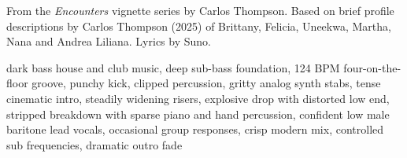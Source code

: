 
\begin{notes}
From the \emph{Encounters} vignette series by Carlos Thompson. Based on brief profile descriptions by Carlos Thompson (2025) of Brittany, Felicia, Uneekwa, Martha, Nana and Andrea Liliana. Lyrics by Suno.
\end{notes}
\begin{style}
dark bass house and club music, deep sub-bass foundation, 124 BPM four-on-the-floor groove, punchy kick, clipped percussion, gritty analog synth stabs, tense cinematic intro, steadily widening risers, explosive drop with distorted low end, stripped breakdown with sparse piano and hand percussion, confident low male baritone lead vocals, occasional group responses, crisp modern mix, controlled sub frequencies, dramatic outro fade
\end{style}

